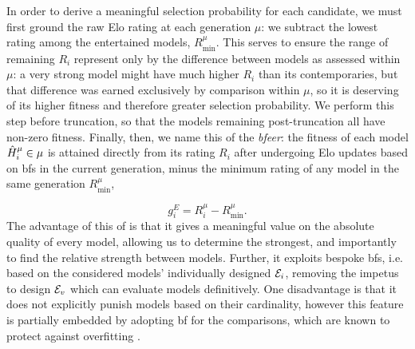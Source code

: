 {\par 
In order to derive a meaningful selection probability for each candidate, 
    we must first ground the raw \gls{Elo rating} at each generation $\mu$:
    we subtract the lowest rating among the entertained models, $R_{\textrm{min}}^{\mu}$.
This serves to ensure the range of remaining $R_i$ represent only by the difference between
    models as assessed within $\mu$: 
    a very strong model might have much higher $R_i$ than its contemporaries, 
    but that difference was earned exclusively by comparison within $\mu$, 
    so it is deserving of its higher fitness and therefore greater selection probability. 
We perform this step before truncation\footnotemark, so that the models remaining post-truncation
    all have non-zero fitness. 
Finally, then, we name this \gls{of} the \emph{\gls{bfeer}}:
    the fitness of each model $\hat{H}_i^{\mu} \in \mu$ is attained directly from its rating $R_i$
    after undergoing Elo updates based on \glspl{bf} in the current generation, minus the minimum rating of any model 
    in the same generation $R^{\mu}_{\textrm{min}}$,

\begin{equation}
    \label{eqn:elo_fitness}
    g_i^E = R_i^{\mu} - R_{\textrm{min}}^{\mu}.
\end{equation}
The advantage of this \gls{of} is that it gives a meaningful value on the absolute quality of every model, 
    allowing us to determine the strongest, and importantly to find the relative strength between models. 
Further, it exploits bespoke \glspl{bf}, i.e. based on the considered models' 
    individually designed ${ \mathcal{E} }_i$,
    removing the impetus to design ${ \mathcal{E} }_v$ which can
    evaluate models definitively. 
One disadvantage is that it does not explicitly punish models based 
    on their cardinality, 
    however this feature is partially embedded by adopting \gls{bf} for the comparisons, 
    which are known to protect against overfitting \cite{kass1995bayes}.

}
